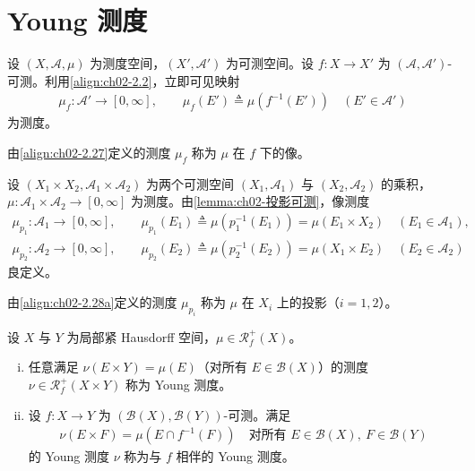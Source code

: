 \documentclass[../../main.tex]{subfiles}%
\begin{document}
\section{Young 测度}\label{section:ch02-Young测度}

设 $(X,\mathscr A,\mu)$ 为测度空间，$(X',\mathscr A')$ 为可测空间。设 $f:X\to X'$ 为 $(\mathscr A,\mathscr A')$-可测。利用\eqref{align:ch02-2.2}，立即可见映射
\begin{align}
\mu_f:\mathscr A'\to[0,\infty],\qquad \mu_f(E')\triangleq \mu(f^{-1}(E'))\quad(E'\in\mathscr A') \label{align:ch02-2.27}
\end{align}
为测度。

\begin{definition}\label{definition:ch02-像测度}
由\eqref{align:ch02-2.27}定义的测度 $\mu_f$ 称为 $\mu$ 在 $f$ 下的像。
\end{definition}

设 $(X_1\times X_2,\mathscr A_1\times\mathscr A_2)$ 为两个可测空间 $(X_1,\mathscr A_1)$ 与 $(X_2,\mathscr A_2)$ 的乘积，$\mu:\mathscr A_1\times\mathscr A_2\to[0,\infty]$ 为测度。由\cref{lemma:ch02-投影可测}，像测度
\begin{align}
\mu_{p_1}:\mathscr A_1\to[0,\infty],\qquad \mu_{p_1}(E_1)\triangleq \mu(p_1^{-1}(E_1))=\mu(E_1\times X_2)\quad(E_1\in\mathscr A_1), \label{align:ch02-2.28a}\\
\mu_{p_2}:\mathscr A_2\to[0,\infty],\qquad \mu_{p_2}(E_2)\triangleq \mu(p_2^{-1}(E_2))=\mu(X_1\times E_2)\quad(E_2\in\mathscr A_2) \label{align:ch02-2.28b}
\end{align}
良定义。

\begin{definition}\label{definition:ch02-投影测度}
由\eqref{align:ch02-2.28a}定义的测度 $\mu_{p_i}$ 称为 $\mu$ 在 $X_i$ 上的投影（$i=1,2$）。
\end{definition}

\begin{definition}\label{definition:ch02-Young测度}
设 $X$ 与 $Y$ 为局部紧 Hausdorff 空间，$\mu\in\mathscr R^+_f(X)$。
\begin{enumerate}[(i)]
\item 任意满足 $\nu(E\times Y)=\mu(E)$（对所有 $E\in\mathscr B(X)$）的测度 $\nu\in\mathscr R^+_f(X\times Y)$ 称为 Young 测度。
\item 设 $f:X\to Y$ 为 $(\mathscr B(X),\mathscr B(Y))$-可测。满足
\begin{align}
\nu(E\times F)=\mu(E\cap f^{-1}(F))\quad\text{对所有 }E\in\mathscr B(X),\ F\in\mathscr B(Y) \label{align:ch02-2.29}
\end{align}
的 Young 测度 $\nu$ 称为与 $f$ 相伴的 Young 测度。
\end{enumerate}
\end{definition}
\end{document}
